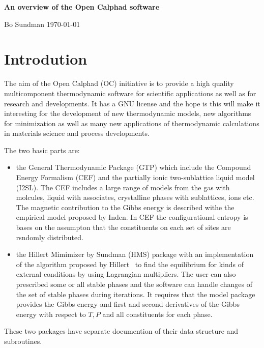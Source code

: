 \documentclass[12pt]{article}
\begin{document}
\begin{center}
{\Large \bf An overview of the Open Calphad software}

\bigskip

Bo Sundman \today

\end{center}

\section{Introdution}

The aim of the Open Calphad (OC) initiative\cite{14Sun} is to provide
a high quality multicomponent thermodynamic software for scientific
applications as well as for research and developments.  It has a GNU
license and the hope is this will make it interesting for the
development of new thermodynamic models, new algorithms for
minimization as well as many new applications of thermodynamic
calculations in materials science and process developments.

The two basic parts are:

\begin{itemize}
\item the General Thermodynamic Package (GTP) which include the
  Compound Energy Formalism (CEF)\cite{01Hil,07Luk} and the partially
  ionic two-sublattice liquid model (I2SL)\cite{85Hil,07Luk}.  The CEF
  includes a large range of models from the gas with molcules, liquid
  with associates, crystalline phases with sublattices, ions etc.  The
  magnetic contribution to the Gibbs energy is described withe the
  empirical model proposed by Inden\cite{81Ind}.  In CEF the
  configurational entropy is bases on the assumpton that the
  constituents on each set of sites are rsndomly distributed.
\item the Hillert Mimimizer by Sundman (HMS) package with an
  implementation of the algorithm proposed by
  Hillert~\cite{81Hil,15Sun} to find the equilibrium for kinds of
  external conditions by using Lagrangian multipliers.  The user can
  also prescribed some or all stable phases and the software can
  handle changes of the set of stable phases during iterations.  It
  requires that the model package provides the Gibbs energy and first
  and second derivatives of the Gibbs energy with respect to $T, P$
  and all constituents for each phase.
\end{itemize}

These two packages have separate documention of their data structure
and subroutines.
\end{document}
